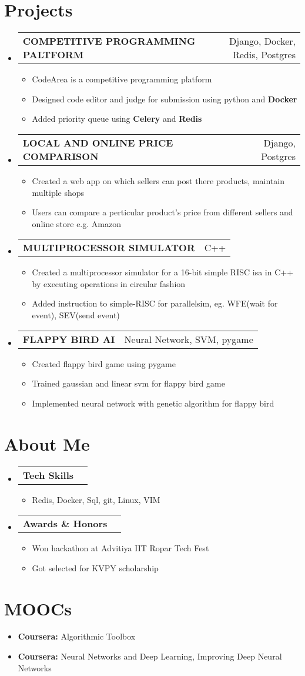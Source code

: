 \documentclass[letterpaper,11pt]{article}
\makeatletter
\newcommand{\resumeItem}[2]{
  \item\small{
    \textbf{#1:}{ #2 \vspace{-2pt}}
  }
}
\newcommand{\resumeSimpleItem}[1]{
    \item\small{
        {#1}
    }
}
\newcommand{\resumeSimpleSubheading}[2]{
  \vspace{-1pt}\item
    \begin{tabular*}{0.97\textwidth}[t]{l@{\extracolsep{\fill}}r}
      \textbf{#1} & #2 \\
    \end{tabular*}\vspace{-5pt}
}
\newcommand{\resumeListTitle}[1]{
    \vspace{-1pt}\item
    \begin{tabular*}{0.97\textwidth}[t]{l@{\extracolsep{\fill}}r}
        \textbf{#1} \\
    \end{tabular*}\vspace{-5pt}
}
\newcommand{\resumeSubHeadingListStart}{\begin{itemize}[leftmargin=*]}
\newcommand{\resumeSubHeadingListEnd}{\end{itemize}}
\newcommand{\resumeItemListStart}{\begin{itemize}}
\newcommand{\resumeItemListEnd}{\end{itemize}\vspace{-5pt}}
\makeatother
\begin{document}
\section{Projects}
  \resumeSubHeadingListStart
    \resumeSimpleSubheading
    {COMPETITIVE PROGRAMMING PALTFORM}{Django, Docker, Redis, Postgres}
    \resumeItemListStart
      \resumeSimpleItem {CodeArea is a competitive programming platform}
      \resumeSimpleItem {Designed code editor and judge for submission using python and \textbf{Docker}}
      \resumeSimpleItem {Added priority queue using \textbf{Celery} and \textbf{Redis}}
    \resumeItemListEnd
    \resumeSimpleSubheading
    {LOCAL AND ONLINE PRICE COMPARISON}{Django, Postgres}
    \resumeItemListStart
        \resumeSimpleItem {Created a web app on which sellers can post there products, maintain multiple shops}
        \resumeSimpleItem {Users can compare a perticular product's price from different sellers and online store e.g. Amazon}
    \resumeItemListEnd
    \resumeSimpleSubheading
    {MULTIPROCESSOR SIMULATOR}{C++}
    \resumeItemListStart
      \resumeSimpleItem {Created a multiprocessor simulator for a 16-bit simple RISC isa in C++ by executing operations in circular fashion}
      \resumeSimpleItem {Added instruction to simple-RISC for parallelsim, eg. WFE(wait for event), SEV(send event)}
    \resumeItemListEnd
    \resumeSimpleSubheading
    {FLAPPY BIRD AI} {Neural Network, SVM, pygame}
    \resumeItemListStart
      \resumeSimpleItem {Created flappy bird game using pygame}
      \resumeSimpleItem {Trained gaussian and linear svm for flappy bird game}
      \resumeSimpleItem {Implemented neural network with genetic algorithm for flappy bird}
    \resumeItemListEnd
    \resumeSubHeadingListEnd



\section{About Me}
 \resumeSubHeadingListStart
    \resumeListTitle{Tech Skills}
        \resumeItemListStart
            \resumeSimpleItem {Redis, Docker, Sql, git, Linux, VIM}
        \resumeItemListEnd
    \resumeListTitle{Awards \& Honors}
        \resumeItemListStart
            \resumeSimpleItem{Won hackathon at Advitiya IIT Ropar Tech Fest}
            \resumeSimpleItem{Got selected for KVPY scholarship}
        \resumeItemListEnd
 \resumeSubHeadingListEnd
 
\section{MOOCs}
    \resumeItemListStart
        \resumeItem {Coursera}
        {Algorithmic Toolbox}
        \resumeItem {Coursera}
        {Neural Networks and Deep Learning, Improving Deep Neural Networks}
    \resumeItemListEnd



\end{document}

